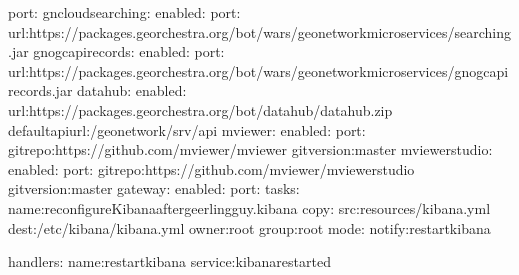 \documentclass[letterpaper,10pt,french]{sphinxmanual}
\begin{document}
\begin{sphinxVerbatim}[commandchars=\\\{\}]
port:
gn\PYGZus{}cloud\PYGZus{}searching:
enabled:
port:
url:https://packages.georchestra.org/bot/wars/geonetwork\PYGZhy{}microservices/searching.jar
gn\PYGZus{}ogc\PYGZus{}api\PYGZus{}records:
enabled:
port:
url:https://packages.georchestra.org/bot/wars/geonetwork\PYGZhy{}microservices/gn\PYGZhy{}ogc\PYGZhy{}api\PYGZhy{}records.jar
datahub:
enabled:
url:https://packages.georchestra.org/bot/datahub/datahub.zip
default\PYGZus{}api\PYGZus{}url:/geonetwork/srv/api
mviewer:
enabled:
port:
gitrepo:https://github.com/mviewer/mviewer
gitversion:master
mviewerstudio:
enabled:
port:
gitrepo:https://github.com/mviewer/mviewerstudio
gitversion:master
gateway:
enabled:
port:
tasks:
\PYGZhy{}name:reconfigureKibanaaftergeerlingguy.kibana
copy:
src:resources/kibana.yml
dest:/etc/kibana/kibana.yml
owner:root
group:root
mode:
notify:restartkibana

handlers:
\PYGZhy{}name:restartkibana
service:kibanarestarted
\end{sphinxVerbatim}
\end{document}

